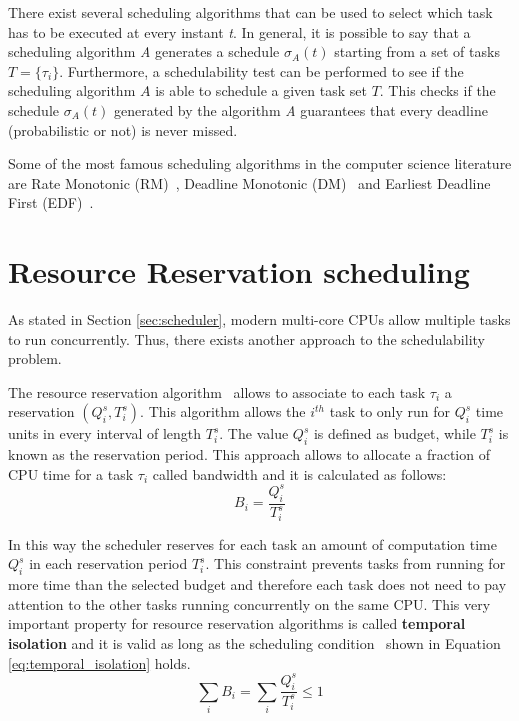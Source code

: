 There exist several scheduling algorithms that can be used to select which task 
has to be executed at every instant \emph{t}. In general, it is
possible to say that a scheduling algorithm \emph{A} generates a schedule
\( \sigma_{A}\left(t\right) \) starting from a set of tasks \( T = \{\tau_{i}\} \).
Furthermore, a schedulability test can be performed to see if the scheduling
algorithm \( A \) is able to schedule a given task set \( T \). This checks
if the schedule \( \sigma_{A}\left(t\right) \) generated by the algorithm \emph{A}
guarantees that every deadline (probabilistic or not) is never missed.

Some of the most famous scheduling algorithms in the computer science literature
are Rate Monotonic (RM)~\cite{lehoczky1989rate}, Deadline Monotonic
(DM)~\cite{audsley1991hard} and Earliest Deadline First (EDF)~\cite{jansen2003lightweight}.


\section{Resource Reservation scheduling}
As stated in Section \ref{sec:scheduler}, modern multi-core CPUs allow multiple
tasks to run concurrently. Thus, there exists another approach to the schedulability
problem.

The resource reservation algorithm~\cite{abeni1998integrating} allows to associate to each task 
\( \tau_{i} \) a reservation \( \left(Q_{i}^s, T_{i}^s\right) \). 
This algorithm allows the \( i^{th} \) task to only run for \( Q_{i}^s \) time units 
in every interval of length \( T_{i}^s \). The value \( Q_{i}^s \) is defined as
budget, while \( T_{i}^s \) is known as the reservation period.
This approach allows to allocate a fraction of CPU time for a task \( \tau_{i} \)
called bandwidth and it is calculated as follows:
\begin{equation}
    B_{i} = \frac{Q_{i}^s}{T_{i}^s}
\end{equation}

In this way the scheduler reserves for each task an amount of computation
time \( Q_{i}^s \) in each reservation period \( T_{i}^s \). This constraint
prevents tasks from running for more time than the selected budget and
therefore each task does not need to pay attention to the other tasks running
concurrently on the same CPU. This very important property for resource reservation algorithms is called
\textbf{temporal isolation} and it is valid as long as the scheduling
condition~\cite{lee2007handbook} shown in Equation \ref{eq:temporal_isolation} 
holds.
\begin{equation} \label{eq:temporal_isolation}
    \displaystyle\sum_{i} B_{i} =  \displaystyle\sum_{i} \frac{Q_{i}^s}{T_{i}^s} \leq 1
\end{equation}

